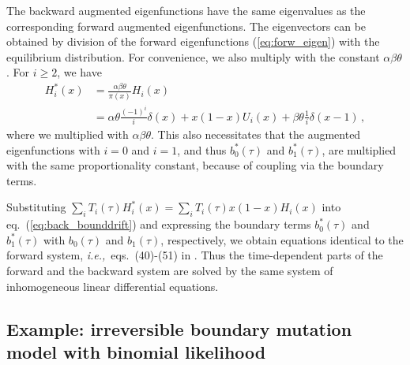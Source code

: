 \documentclass[preprint]{elsarticle}
\newcommand\ie{{\it i.e.,}}
\begin{document}
The backward augmented eigenfunctions have the same eigenvalues as the corresponding forward augmented eigenfunctions. The eigenvectors can be obtained by division of the forward eigenfunctions (\ref{eq:forw_eigen}) with the equilibrium distribution. For convenience, we also multiply with the constant ${\alpha\beta\theta}$. For $i\geq 2$, we have
\begin{equation}\label{eq:backw_eigen}
\begin{split}
    H_i^{*}(x)&= \frac{\alpha\beta\theta}{\pi(x)} H_i(x)\\
    &=\alpha\theta\tfrac{(-1)^i}{ i}\delta(x)+x(1-x)U_i(x)+\beta\theta\tfrac{1}{i}\delta(x-1)\,,
\end{split}
\end{equation}
where we multiplied with $\alpha\beta\theta$. This also necessitates that the augmented eigenfunctions with $i=0$ and $i=1$, and thus $b_0^{*}(\tau)$ and $b_1^{*}(\tau)$, are multiplied with the same proportionality constant, because of coupling via the boundary terms. 

Substituting $\sum_i T_i(\tau)H_i^{*}(x)=\sum_i T_i(\tau)x(1-x)H_i(x)$ into eq.~(\ref{eq:back_bounddrift}) and expressing the boundary terms $b_0^{*}(\tau)$ and $b_1^{*}(\tau)$ with $b_0(\tau)$ and $b_1(\tau)$, respectively, we obtain equations identical to the forward system, \ie\ eqs.~(40)-(51) in \citet{Vogl16}. Thus the time-dependent parts of the forward and the backward system are solved by the same system of inhomogeneous linear differential equations. 

\subsection{Example: irreversible boundary mutation model with binomial likelihood}
\end{document}
